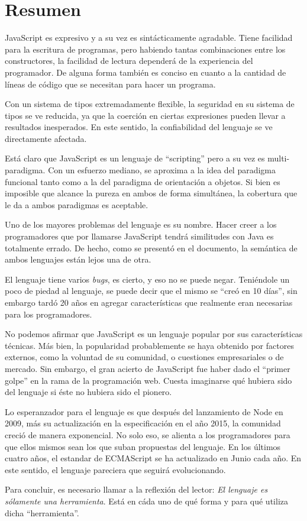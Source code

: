 \section{Resumen}

JavaScript es expresivo y a su vez es sintácticamente agradable. Tiene facilidad para la escritura de programas, pero habiendo tantas combinaciones entre los constructores, la facilidad de lectura dependerá de la experiencia del programador. De alguna forma también es conciso en cuanto a la cantidad de líneas de código que se necesitan para hacer un programa.

Con un sistema de tipos extremadamente flexible, la seguridad en su sistema de tipos se ve reducida, ya que la coerción en ciertas expresiones pueden llevar a resultados inesperados. En este sentido, la confiabilidad del lenguaje se ve directamente afectada. 

Está claro que JavaScript es un lenguaje de "`scripting"' pero a su vez es multi-paradigma. Con un esfuerzo mediano, se aproxima a la idea del paradigma funcional tanto como a la del paradigma de orientación a objetos. Si bien es imposible que alcance la pureza en ambos de forma simultánea, la cobertura que le da a ambos paradigmas es aceptable.

Uno de los mayores problemas del lenguaje es su nombre. Hacer creer a los programadores que por llamarse JavaScript tendrá similitudes con Java es totalmente errado. De hecho, como se presentó en el documento, la semántica de ambos lenguajes están lejos una de otra.

El lenguaje tiene varios \textit{bugs}, es cierto, y eso no se puede negar. Teniéndole un poco de piedad al lenguaje, se puede decir que el mismo se "`creó en 10 días"', sin embargo tardó 20 años en agregar características que realmente eran necesarias para los programadores. 

No podemos afirmar que JavaScript es un lenguaje popular por sus características técnicas. Más bien, la popularidad probablemente se haya obtenido por factores externos, como la voluntad de su comunidad, o cuestiones empresariales o de mercado. Sin embargo, el gran acierto de JavaScript fue haber dado el "`primer golpe"' en la rama de la programación web. Cuesta imaginarse qué hubiera sido del lenguaje si éste no hubiera sido el pionero.

Lo esperanzador para el lenguaje es que después del lanzamiento de Node en 2009, más su actualización en la especificación en el año 2015, la comunidad creció de manera exponencial. No solo eso, se alienta a los programadores para que ellos mismos sean los que suban propuestas del lenguaje. En los últimos cuatro años, el estandar de ECMAScript se ha actualizado en Junio cada año. En este sentido, el lenguaje pareciera que seguirá evolucionando.

Para concluir, es necesario llamar a la reflexión del lector: \textit{El lenguaje es sólamente una herramienta}. Está en cáda uno de qué forma y para qué utiliza dicha "`herramienta"'.